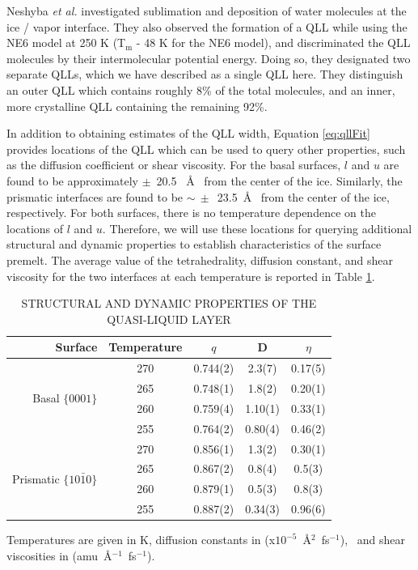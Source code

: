 Neshyba \textit{et al.} investigated sublimation and deposition of
water molecules at the ice / vapor interface.\cite{Neshyba2009} They
also observed the formation of a QLL while using the NE6
model\cite{Nada2003a} at 250 K (T$_\mathrm{m}$ - 48 K for the NE6
model), and discriminated the QLL molecules by their intermolecular
potential energy. Doing so, they designated two separate QLLs, which
we have described as a single QLL here. They distinguish an outer QLL
which contains roughly 8\% of the total molecules, and an inner, more
crystalline QLL containing the remaining 92\%. 

In addition to obtaining estimates of the QLL width, Equation
\eqref{eq:qllFit} provides locations of the QLL which can be used to
query other properties, such as the diffusion coefficient or shear
viscosity. For the basal surfaces, $l$ and $u$ are found to be
approximately $\pm$~20.5 ~\AA~ from the center of the ice. Similarly,
the prismatic interfaces are found to be $\sim~\pm$~23.5~\AA~ from the
center of the ice, respectively. For both surfaces, there is no
temperature dependence on the locations of $l$ and
$u$. Therefore, we will use these locations for querying additional
structural and dynamic properties to establish characteristics of the
surface premelt. The average value of the tetrahedrality, diffusion
constant, and shear viscosity for the two interfaces at each
temperature is reported in Table \ref{tab:qllResults}.

\begin{table}[h] \centering \caption{STRUCTURAL AND DYNAMIC
    PROPERTIES OF THE QUASI-LIQUID LAYER\label{tab:qllResults}}
\begin{tabular}{rcccc}
\hline
\hline
Surface & Temperature & $q$ & D & $\eta$ \\
\hline
\multirow{ 4}{*}{Basal  $\{0001\}$} & 270 & 0.744(2) &2.3(7) & 0.17(5)\\ &265 &
                                                                    0.748(1)&
                                                                              1.8(2) & 0.20(1) \\ &260 &  0.759(4)& 1.10(1) & 0.33(1) \\ &255 & 0.764(2) & 0.80(4) & 0.46(2) \\
\hline
\multirow{ 4}{*}{Prismatic  $\{10\bar{1}0\}$} & 270 & 0.856(1) &  1.3(2) &  0.30(1) 
\\ & 265 & 0.867(2) &0.8(4) & 0.5(3) \\ & 260 & 0.879(1) & 0.5(3) &
                                                                      0.8(3) \\
        & 255 & 0.887(2) &0.34(3) &0.96(6)\\
\hline
\hline
\end{tabular}
\begin{flushleft}
  Temperatures are given in K, diffusion constants in
  (x$10^{-5}$~\AA$^{2}$~fs$^{-1}$),~ and shear viscosities in
  (amu~\AA$^{-1}$~fs$^{-1}$).
\end{flushleft}
\end{table}

